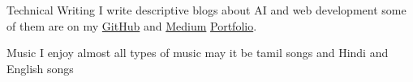 



\begin{cvskills}
  \cvskill
    {Technical Writing} %
    {I write descriptive blogs about AI and web development some of them are on my \href{https://github.com/ajitharunai/}{GitHub} and \href{https://medium.com/@ajitharunai}{Medium} \href{https://ajicreations.netlify.app/} {Portfolio}.} 

  \cvskill
    {Music} %
    {I enjoy almost all types of music may it be tamil songs and Hindi and English songs } %

\end{cvskills}